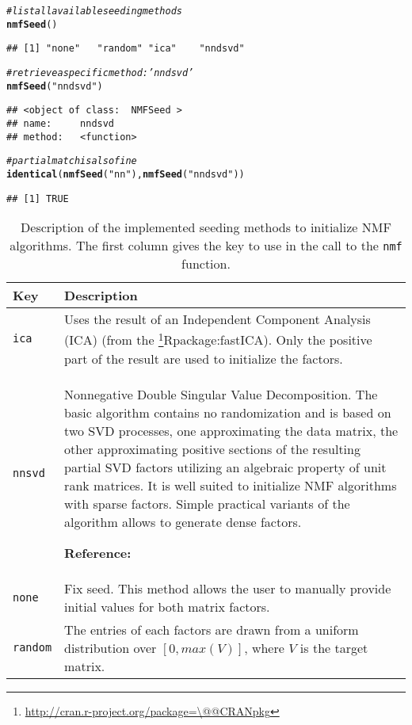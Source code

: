 \documentclass[a4paper]{article}\usepackage[]{graphicx}\usepackage[]{color}
\makeatletter
\newcommand{\hlstr}[1]{\textcolor[rgb]{0.192,0.494,0.8}{#1}}%
\newcommand{\hlcom}[1]{\textcolor[rgb]{0.678,0.584,0.686}{\textit{#1}}}%
\newcommand{\hlstd}[1]{\textcolor[rgb]{0.345,0.345,0.345}{#1}}%
\newcommand{\hlkwd}[1]{\textcolor[rgb]{0.737,0.353,0.396}{\textbf{#1}}}%
\newenvironment{kframe}{%
 \def\at@end@of@kframe{}%
 \ifinner\ifhmode%
  \def\at@end@of@kframe{\end{minipage}}%
  \begin{minipage}{\columnwidth}%
 \fi\fi%
 \def\FrameCommand##1{\hskip\@totalleftmargin \hskip-\fboxsep
 \colorbox{shadecolor}{##1}\hskip-\fboxsep
     \hskip-\linewidth \hskip-\@totalleftmargin \hskip\columnwidth}%
 \MakeFramed {\advance\hsize-\width
   \@totalleftmargin\z@ \linewidth\hsize
   \@setminipage}}%
 {\par\unskip\endMakeFramed%
 \at@end@of@kframe}
\newenvironment{knitrout}{}{} %
\let\code=\texttt
\newcommand{\pkgname}[1]{\textit{#1}\xspace}
\newcommand{\CRANurl}[1]{\url{http://cran.r-project.org/package=#1}}
\def\CRANpkg{\@ifstar\@CRANpkg\@@CRANpkg}
\def\@CRANpkg#1{\href{http://cran.r-project.org/package=#1}{\pkgname{#1}}\footnote{\CRANurl{#1}}}
\def\@@CRANpkg#1{\href{http://cran.r-project.org/package=#1}{\pkgname{#1}} package\footnote{\CRANurl{#1}}}
\def\citeCRANpkg{\@ifstar\@citeCRANpkg\@@citeCRANpkg}
\def\@citeCRANpkg#1{\CRANpkg{#1}\cite*{Rpackage:#1}}
\def\@@citeCRANpkg#1{\CRANpkg{#1}~\cite{Rpackage:#1}}
\renewcommand{\cite}[1]{\parencite{#1}}
\makeatother
\begin{document}
\begin{knitrout}
\color{fgcolor}\begin{kframe}
\begin{alltt}
\hlcom{# list all available seeding methods}
\hlkwd{nmfSeed}\hlstd{()}
\end{alltt}
\begin{verbatim}
## [1] "none"   "random" "ica"    "nndsvd"
\end{verbatim}
\begin{alltt}
\hlcom{# retrieve a specific method: 'nndsvd'}
\hlkwd{nmfSeed}\hlstd{(}\hlstr{"nndsvd"}\hlstd{)}
\end{alltt}
\begin{verbatim}
## <object of class:  NMFSeed >
## name:	 nndsvd 
## method:	 <function>
\end{verbatim}
\begin{alltt}
\hlcom{# partial match is also fine}
\hlkwd{identical}\hlstd{(}\hlkwd{nmfSeed}\hlstd{(}\hlstr{"nn"}\hlstd{),} \hlkwd{nmfSeed}\hlstd{(}\hlstr{"nndsvd"}\hlstd{))}
\end{alltt}
\begin{verbatim}
## [1] TRUE
\end{verbatim}
\end{kframe}
\end{knitrout}


\begin{table}[h!t]
\begin{tabularx}{\textwidth}{lX}
\hline
Key & Description\\
\hline
\code{ica} & Uses the result of an Independent Component Analysis (ICA) (from
the \citeCRANpkg{fastICA}).
Only the positive part of the result are used to initialize the factors.\\
\hline
%
\code{nnsvd} & Nonnegative Double Singular Value Decomposition.
The basic algorithm contains no randomization and is based on two SVD processes, one approximating the data matrix, the other approximating positive sections of the resulting partial SVD factors utilizing an algebraic property of unit rank matrices. 
It is well suited to initialize NMF algorithms with sparse factors. Simple practical variants of the algorithm allows to generate dense factors.

\textbf{Reference:} \cite{Boutsidis2008}\\
\hline
%
\code{none} & Fix seed.
This method allows the user to manually provide initial values for both matrix factors.\\ 
\hline
%
\code{random} & The entries of each factors are drawn from a uniform distribution over $[0, max(V)]$, where $V$ is the target matrix.\\
\hline
\end{tabularx}
\caption{Description of the implemented seeding methods to initialize NMF algorithms.
The first column gives the key to use in the call to the \texttt{nmf} function.\label{tab:seed}}
\end{table}
\end{document}
